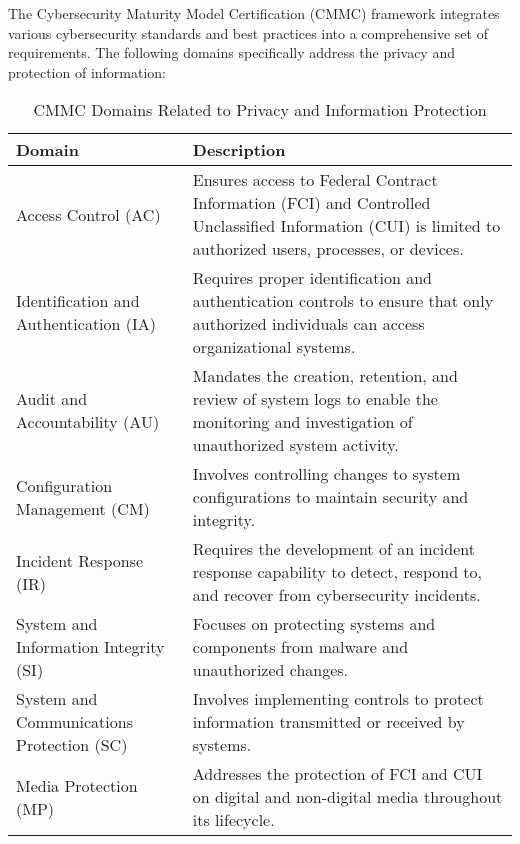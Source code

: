 \documentclass{tufte-handout}
\begin{document}
The Cybersecurity Maturity Model Certification (CMMC) framework integrates various cybersecurity standards and best practices into a comprehensive set of requirements.
The following domains specifically address the privacy and protection of information:

\begin{table}[h]
    \centering
    \begin{tabular}{lp{10cm}}
        \toprule
        \textbf{Domain} & \textbf{Description} \\
        \midrule
		Access Control (AC) & Ensures access to Federal Contract Information (FCI) and Controlled Unclassified Information (CUI) is limited to authorized users, processes, or devices. \\
		Identification and Authentication (IA) & Requires proper identification and authentication controls to ensure that only authorized individuals can access organizational systems. \\
		Audit and Accountability (AU) & Mandates the creation, retention, and review of system logs to enable the monitoring and investigation of unauthorized system activity. \\
		Configuration Management (CM) & Involves controlling changes to system configurations to maintain security and integrity. \\
		Incident Response (IR) & Requires the development of an incident response capability to detect, respond to, and recover from cybersecurity incidents. \\
		System and Information Integrity (SI) & Focuses on protecting systems and components from malware and unauthorized changes. \\
		System and Communications Protection (SC) & Involves implementing controls to protect information transmitted or received by systems. \\
		Media Protection (MP) & Addresses the protection of FCI and CUI on digital and non-digital media throughout its lifecycle. \\
        \bottomrule
    \end{tabular}
    \caption{CMMC Domains Related to Privacy and Information Protection}
    \label{tab:CMMC_domains}
\end{table}
\end{document}
